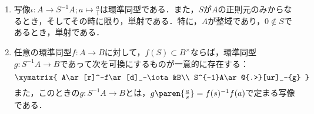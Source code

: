 \documentclass[uplatex,dvipdfmx]{jsreport}
\begin{document}
\begin{proposition}[局所化の普遍性]\label{prop-universality-of-localization}\mbox{}
    \begin{enumerate}
        \item 写像$\iota:A\to S^{-1}A;a\mapsto\frac{a}{1}$は環準同型である．また，$S$が$A$の正則元のみからなるとき，そしてその時に限り，単射である．特に，$A$が整域であり，$0\notin S$であるとき，単射である．
        \item 任意の環準同型$f:A\to B$に対して，$f(S)\subset B^\times$ならば，環準同型$g:S^{-1}A\to B$であって次を可換にするものが一意的に存在する：\[\xymatrix{
            A\ar[r]^-f\ar[d]_-\iota&B\\
            S^{-1}A\ar@{.>}[ur]_-{g}
        }\]
        また，このときの$g:S^{-1}A\to B$とは，$g\paren{\frac{a}{s}}=f(s)^{-1}f(a)$で定まる写像である．
    \end{enumerate}
\end{proposition}
\end{document}
